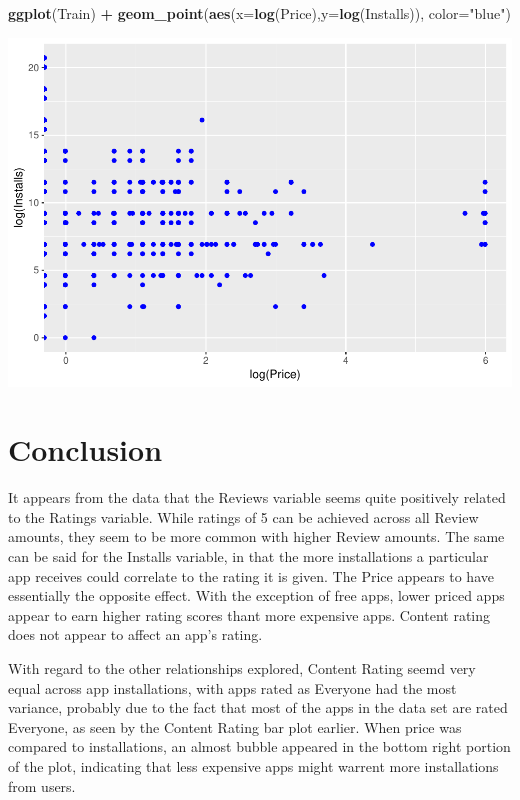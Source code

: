 \documentclass[]{article}
\newenvironment{Shaded}{\begin{snugshade}}{\end{snugshade}}
\newcommand{\DataTypeTok}[1]{\textcolor[rgb]{0.13,0.29,0.53}{#1}}
\newcommand{\KeywordTok}[1]{\textcolor[rgb]{0.13,0.29,0.53}{\textbf{#1}}}
\newcommand{\NormalTok}[1]{#1}
\newcommand{\OperatorTok}[1]{\textcolor[rgb]{0.81,0.36,0.00}{\textbf{#1}}}
\newcommand{\StringTok}[1]{\textcolor[rgb]{0.31,0.60,0.02}{#1}}
\begin{document}
\begin{Shaded}
\begin{Highlighting}[]
\KeywordTok{ggplot}\NormalTok{(Train) }\OperatorTok{+}\StringTok{ }\KeywordTok{geom_point}\NormalTok{(}\KeywordTok{aes}\NormalTok{(}\DataTypeTok{x=}\KeywordTok{log}\NormalTok{(Price),}\DataTypeTok{y=}\KeywordTok{log}\NormalTok{(Installs)), }\DataTypeTok{color=}\StringTok{"blue"}\NormalTok{)}
\end{Highlighting}
\end{Shaded}

\includegraphics{Project_2_Work_files/figure-latex/unnamed-chunk-17-2.pdf}

\hypertarget{conclusion}{%
\section{Conclusion}\label{conclusion}}

It appears from the data that the Reviews variable seems quite
positively related to the Ratings variable. While ratings of 5 can be
achieved across all Review amounts, they seem to be more common with
higher Review amounts. The same can be said for the Installs variable,
in that the more installations a particular app receives could correlate
to the rating it is given. The Price appears to have essentially the
opposite effect. With the exception of free apps, lower priced apps
appear to earn higher rating scores thant more expensive apps. Content
rating does not appear to affect an app's rating.

With regard to the other relationships explored, Content Rating seemd
very equal across app installations, with apps rated as Everyone had the
most variance, probably due to the fact that most of the apps in the
data set are rated Everyone, as seen by the Content Rating bar plot
earlier. When price was compared to installations, an almost bubble
appeared in the bottom right portion of the plot, indicating that less
expensive apps might warrent more installations from users.
\end{document}
